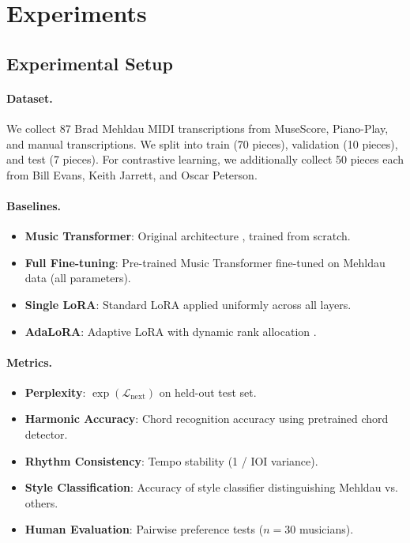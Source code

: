 \documentclass{article}
\begin{document}
\section{Experiments}

\subsection{Experimental Setup}

\paragraph{Dataset.}
We collect 87 Brad Mehldau MIDI transcriptions from MuseScore, Piano-Play, and manual transcriptions. We split into train (70 pieces), validation (10 pieces), and test (7 pieces). For contrastive learning, we additionally collect 50 pieces each from Bill Evans, Keith Jarrett, and Oscar Peterson.

\paragraph{Baselines.}
\begin{itemize}
    \item \textbf{Music Transformer}: Original architecture \cite{huang2018music}, trained from scratch.
    \item \textbf{Full Fine-tuning}: Pre-trained Music Transformer fine-tuned on Mehldau data (all parameters).
    \item \textbf{Single LoRA}: Standard LoRA applied uniformly across all layers.
    \item \textbf{AdaLoRA}: Adaptive LoRA with dynamic rank allocation \cite{zhang2023adalora}.
\end{itemize}

\paragraph{Metrics.}
\begin{itemize}
    \item \textbf{Perplexity}: $\exp(\mathcal{L}_{\text{next}})$ on held-out test set.
    \item \textbf{Harmonic Accuracy}: Chord recognition accuracy using pretrained chord detector.
    \item \textbf{Rhythm Consistency}: Tempo stability (1 / IOI variance).
    \item \textbf{Style Classification}: Accuracy of style classifier distinguishing Mehldau vs. others.
    \item \textbf{Human Evaluation}: Pairwise preference tests ($n=30$ musicians).
\end{itemize}
\end{document}
